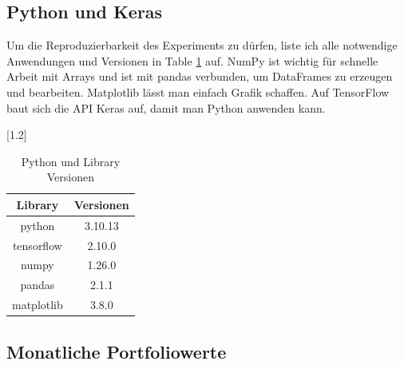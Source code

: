 \documentclass[12pt]{article}
\begin{document}
        \subsection{Python und Keras}
                
            Um die Reproduzierbarkeit des Experiments zu dürfen, 
            liste ich alle notwendige Anwendungen und Versionen in Table \ref{pl-versionen} auf.    
            NumPy \cite{harris2020-numpy} ist wichtig für schnelle Arbeit mit Arrays und ist mit 
            pandas \cite{reback2020-pandas} \cite{mckinney2010-pandas} verbunden, um DataFrames zu erzeugen und bearbeiten. 
            Matplotlib \cite{hunter2007-matplotlib} lässt man einfach Grafik schaffen. 
            Auf TensorFlow \cite{tensorflow2016} baut sich die API Keras \cite{chollet2015-keras} auf, 
            damit man Python anwenden kann.
                
                
            \begin{table}[htp]

                \begin{center} 

                \scalebox{1.2}[1.2]{
                \begin{tabular}{ | c | c | }
                \hline
                \textbf{Library}    &       \textbf{Versionen} \\
                \hline
                python              &       3.10.13 \\ 
                tensorflow          &       2.10.0 \\
                numpy               &       1.26.0 \\
                pandas              &       2.1.1 \\
                matplotlib          &       3.8.0 \\
                
                \hline
                \end{tabular}
                }

                \caption{Python und Library Versionen}
                \label{pl-versionen}

                \end{center}

            \end{table}
       

        \subsection{Monatliche Portfoliowerte}
\end{document}

